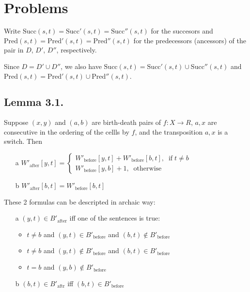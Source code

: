 \documentclass{article}
\begin{document}
\section{Problems}

\par Write $\text{Succ}(s, t) = \text{Succ}'(s, t) = \text{Succ}''(s, t)$ for the succesors and $\text{Pred}(s, t) = \text{Pred}'(s, t) = \text{Pred}''(s, t)$ for the predecessors (ancessors) of the pair in $D$, $D'$, $D''$, respectively.

\par Since $D = D' \cup D''$, we also have $\text{Succ}(s, t) = \text{Succ}'(s, t) \cup \text{Succ}''(s, t)$ and $\text{Pred}(s, t) = \text{Pred}'(s, t) \cup \text{Pred}''(s, t)$.

\subsection{Lemma 3.1.}
\par Suppose $(x, y)$ and $(a, b)$ are birth-death pairs of $f: X\to R$, $a, x$ are consecutive in the ordering of the cellls by $f$, and the transposition $a, x$ is a switch. Then
\begin{itemize}
\item[a] $
W'_\text{after}[y, t] =
\begin{cases}
W'_\text{before}[y, t] + W'_\text{before}[b, t], \;\; \text{if}\; t\ne b \\
W'_\text{before}[y, b] + 1, \;\; \text{otherwise}
\end{cases}
$
\item[b] $W'_\text{after}[b, t] = W'_\text{before}[b, t]$
\end{itemize}

These 2 formulas can be descripted in archaic way:
\begin{itemize}
\item[a] $(y, t)\in B'_\text{after}$ iff one of the sentences is true:
\begin{itemize}
\item $t\ne b$ and $(y, t)\in B'_\text{before}$ and $(b, t)\notin B'_\text{before}$
\item $t\ne b$ and $(y, t)\notin B'_\text{before}$ and $(b, t)\in B'_\text{before}$
\item $t = b$ and $(y, b)\notin B'_\text{before}$
\end{itemize}
\item[b] $(b, t)\in B'_\text{aftr}$ iff $(b, t)\in B'_\text{before}$
\end{itemize}
\end{document}
